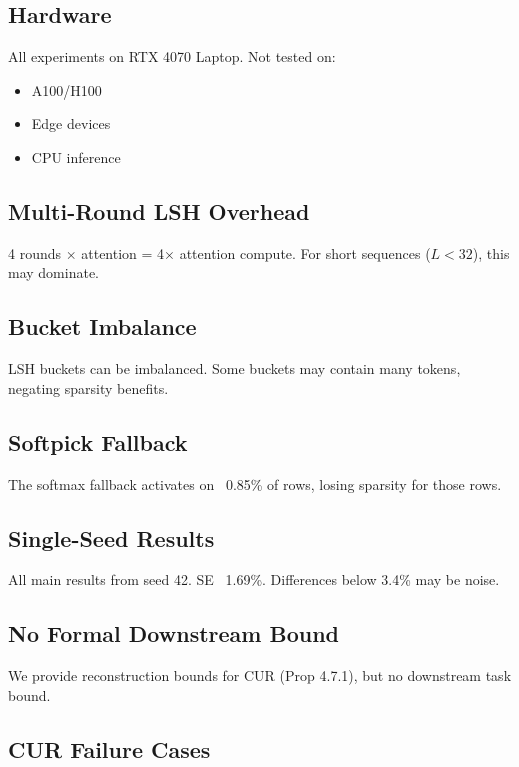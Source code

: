 \subsection{Hardware}

All experiments on RTX 4070 Laptop. Not tested on:
\begin{itemize}
\item A100/H100
\item Edge devices
\item CPU inference

\end{itemize}
\subsection{Multi-Round LSH Overhead}

4 rounds $\times$ attention = 4$\times$ attention compute. For short sequences 
($L < 32$), this may dominate.

\subsection{Bucket Imbalance}

LSH buckets can be imbalanced. Some buckets may contain many tokens, 
negating sparsity benefits.

\subsection{Softpick Fallback}

The softmax fallback activates on ~0.85\% of rows, losing 
sparsity for those rows.

\subsection{Single-Seed Results}

All main results from seed 42. SE ~1.69\%. Differences below 3.4\% 
may be noise.

\subsection{No Formal Downstream Bound}

We provide reconstruction bounds for CUR (Prop 4.7.1), but no downstream 
task bound.

\subsection{CUR Failure Cases}

